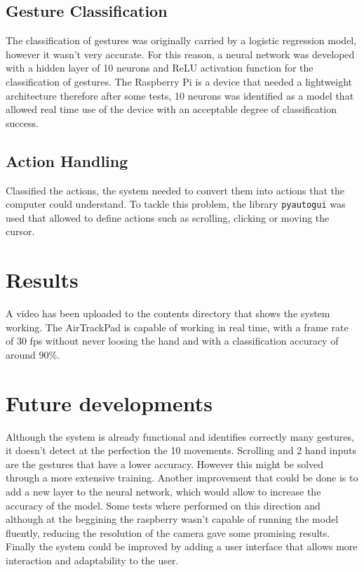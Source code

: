\documentclass[a4paper,12pt]{article}
\begin{document}
{\subsection{Gesture Classification}

The classification of gestures was originally carried by a logistic regression model, however it wasn't very accurate. For this reason, a neural network was 
developed with a hidden layer of 10 neurons and ReLU activation function for the classification of gestures. The Raspberry Pi is a device that needed a lightweight 
architecture therefore after some tests, 10 neurons was identified as a model that allowed real time use of the device with an acceptable degree of classification success.

\subsection{Action Handling}

Classified the actions, the system needed to convert them into actions that the computer could understand. To tackle this problem, the library \texttt{pyautogui} was used that 
allowed to define actions such as scrolling, clicking or moving the cursor.

\vspace{0.5cm}

\section{Results}

A video has been uploaded to the contents directory that shows the system working. The AirTrackPad is capable of working in real time, with a frame rate of 30 fps without never 
loosing the hand and with a classification accuracy of around 90\%. 

\vspace{0.5cm}

\section{Future developments}

Although the system is already functional and identifies correctly many gestures, it doesn't detect at the perfection the 10 movements. Scrolling and 2 hand inputs are the 
gestures that have a lower accuracy. However this might be solved through a more extensive training. Another improvement that could be done is to add a new layer to the neural
network, which would allow to increase the accuracy of the model. Some tests where performed on this direction and although at the beggining the raspberry wasn't capable 
of running the model fluently, reducing the resolution of the camera gave some promising results. Finally the system could be improved by adding a user interface 
that allows more interaction and adaptability to the user.

}
\end{document}
